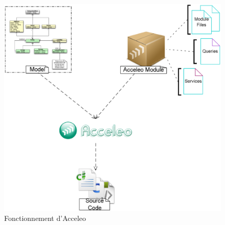 \begin{figure}[htb]
  \centering
  \includegraphics[scale=0.29]{img/acceleo_scheme.eps}
  \caption{Fonctionnement d'Acceleo}
  \label{fig:acceleo}
\end{figure}

%

\clearpage

